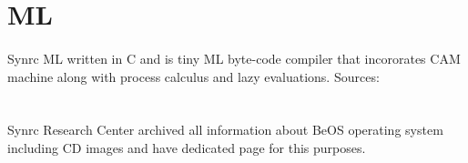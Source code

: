 \documentclass[11pt]{article}
\begin{document}
\section*{ML}
\paragraph{}
Synrc ML written in C and is tiny ML byte-code compiler that incororates CAM machine
along with process calculus and lazy evaluations.
Sources: 

\section*{}
\paragraph{}
Synrc Research Center archived all information about BeOS operating system 
including CD images and have dedicated page for this purposes.


\end{document}
